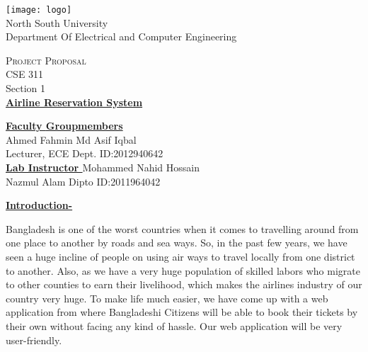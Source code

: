 \documentclass[12pt]{article}
\begin{document}
\begin{center}
\texttt{[image: logo]}\\
\vspace{5mm}
\thispagestyle{empty}
\LARGE{ \rmfamily    North South University} \\
\Large
\vspace{4mm}
\rmfamily  Department Of Electrical and Computer Engineering \\
\vspace{4mm}

\textsc{\LARGE Project Proposal} \\
\vspace{4mm}
CSE 311\\Section 1  \\
\vspace{4mm}
\vspace{9mm}
\LARGE{\textbf{\underline{\sffamily \color{red} Airline Reservation System}}}\\
\vspace{5mm}
\vspace{5mm}
\end{center}

\textbf{\underline {Faculty }} \hfill  \textbf{\underline {Groupmembers}} \\
Ahmed Fahmin \hfill Md Asif Iqbal \\
Lecturer, ECE Dept. \hfill ID:2012940642 \\ 

\textbf{\underline {Lab Instructor }} \hfill Mohammed Nahid Hossain\\
Nazmul Alam Dipto \hfill ID:2011964042
\newpage 

\clearpage
{} 




\LARGE \textbf{\underline{Introduction-}}   \\ \vspace{2mm}
\normalsize
\begin{singlespace}
Bangladesh is one of the worst countries when it comes to travelling around from one place to another by roads and sea ways. So, in the past few years, we have seen a huge incline of people on using air ways to travel locally from one district to another. Also, as we have a very huge population of skilled labors who migrate to other counties to earn their livelihood, which makes the airlines industry of our country very huge. To make life much easier, we have come up with a web application from where Bangladeshi Citizens will be able to book their tickets by their own without facing any kind of hassle. Our web application will be very user-friendly.\\
\end{singlespace}
 \vspace{5mm}
\end{document}
